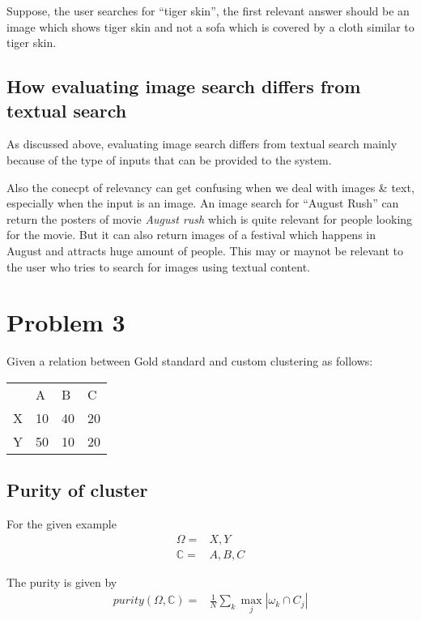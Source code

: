 \documentclass{article}
\begin{document}
Suppose, the user searches for ``tiger skin'', the first relevant answer should be an image which shows tiger skin and not a sofa which is covered by a cloth similar to tiger skin.

\subsection{How evaluating image search differs from textual search}
As discussed above, evaluating image search differs from textual search mainly because of the type of inputs that can be provided to the system.

Also the conecpt of relevancy can get confusing when we deal with images \& text, especially when the input is an image.  An image search for ``August Rush'' can return the posters of movie \textit{August rush} which is quite relevant for people looking for the movie.  But it can also return images of a festival which happens in August and attracts huge amount of people.  This may or maynot be relevant to the user who tries to search for images using textual content.

\section{Problem 3}
Given a relation between Gold standard and custom clustering as follows:
\begin{center}
  \begin{tabular}{llll}
      & A & B & C \\
    X & 10 & 40 & 20 \\
    Y & 50 & 10 & 20 \\
  \end{tabular}
\end{center}

\subsection{Purity of cluster}

For the given example 
\begin{align*}
  \Omega = & {X, Y} \\
  \mathbb{C} = & {A, B, C}
\end{align*}

The purity is given by 
\begin{align*}
  purity(\Omega, \mathbb{C}) = & \frac{1}{N} \sum_{k} \max_{j} |\omega_{k} \cap C_{j}|
\end{align*}
\end{document}
